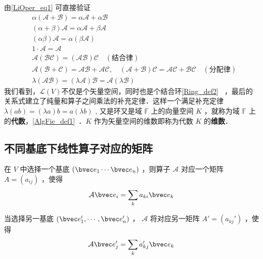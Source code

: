 由\autoref{LiOper_eq1} 可直接验证
\begin{equation}
\begin{aligned}
&\alpha(\mathcal{A+B})=\alpha\mathcal{A}+\alpha\mathcal{B}\\
&(\alpha+\beta)\mathcal{A}=\alpha\mathcal{A}+\beta\mathcal{A}\\
&(\alpha\beta)\mathcal{A}=\alpha(\beta\mathcal{A})\\
&1\cdot \mathcal{A}=\mathcal A\\
&\mathcal{A}(\mathcal{BC})=(\mathcal{AB})\mathcal C\quad(\text{结合律})\\
&\mathcal A(\mathcal{B+C})=\mathcal{AB+AC},\quad (\mathcal{A+B})\mathcal C=\mathcal{AC+BC}\quad(\text{分配律})\\
&\lambda(\mathcal{AB})=(\lambda\mathcal{A})\mathcal{B}=\mathcal{A}(\lambda \mathcal B)
\end{aligned}
\end{equation}
我们看到，$\mathcal{L}(V)$不仅是个矢量空间，同时也是个结合环\autoref{Ring_def2}~ ，最后的关系式建立了纯量和算子之间乘法的补充定律．这样一个满足补充定律 $\lambda(ab)=(\lambda a)b=a(\lambda b)$ , 又是环又是域 $\mathbb{F}$ 上的向量空间 $K$ ，就称为域 $\mathbb{F}$ 上的\textbf{代数}，\autoref{AlgFie_def1}~．$K$ 作为矢量空间的维数即称为代数 $K$ 的\textbf{维数}．

\subsection{不同基底下线性算子对应的矩阵}
在 $V$ 中选择一个基底 $(\bvec e_1\cdots \bvec e_n)$ ，则算子 $\mathcal{A}$ 对应一个矩阵 $A=(a_{ij})$ ，使得
\begin{equation}
\mathcal{A}\bvec e_i=\sum_{k} a_{ki}\bvec e_k
\end{equation}

当选择另一基底 $(\bvec e_1',\cdots,\bvec e_n')$ ， $\mathcal{A}$ 将对应另一矩阵 $A'=(a_{kj}')$ ，使得
\begin{equation}
\mathcal{A}\bvec e_j'=\sum_{k} a'_{kj}\bvec e_k
\end{equation}


